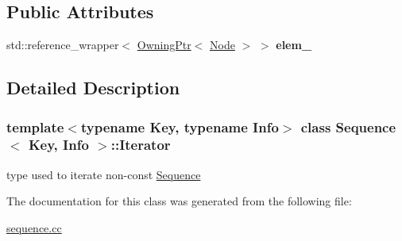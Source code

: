\subsection*{Public Attributes}
\begin{DoxyCompactItemize}
\item 
\mbox{\label{structSequence_1_1Iterator_aac193e5e964435cb31f0408744a5115f}} 
std\+::reference\+\_\+wrapper$<$ \mbox{\hyperlink{structOwningPtr}{Owning\+Ptr}}$<$ \mbox{\hyperlink{structSequence_1_1Node}{Node}} $>$ $>$ {\bfseries elem\+\_\+}
\end{DoxyCompactItemize}


\subsection{Detailed Description}
\subsubsection*{template$<$typename Key, typename Info$>$\newline
class Sequence$<$ Key, Info $>$\+::\+Iterator}

type used to iterate non-\/const \mbox{\hyperlink{structSequence}{Sequence}} 

The documentation for this class was generated from the following file\+:\begin{DoxyCompactItemize}
\item 
\mbox{\hyperlink{sequence_8cc}{sequence.\+cc}}\end{DoxyCompactItemize}

